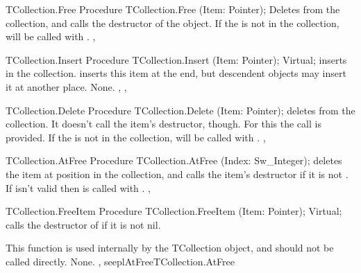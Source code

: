 

\begin{procedure}{TCollection.Free}
\Declaration
Procedure TCollection.Free (Item: Pointer);
\Description
{} Deletes  from the collection, and calls the destructor
 of the object.
\Errors
If the  is not in the collection,  will be called with
.
\SeeAlso
{},
\end{procedure}



\begin{procedure}{TCollection.Insert}
\Declaration
Procedure TCollection.Insert (Item: Pointer); Virtual;
\Description
{} inserts  in the collection. 
inserts this item at the end, but descendent objects may insert it at
another place.
\Errors
None.
\SeeAlso
{}, ,
\end{procedure}


\begin{procedure}{TCollection.Delete}
\Declaration
Procedure TCollection.Delete (Item: Pointer);
\Description
{} deletes  from the collection. It doesn't call the
item's destructor, though. For this the 
call is provided.
\Errors
If the  is not in the collection,  will be called with
.
\SeeAlso
{},
\end{procedure}



\begin{procedure}{TCollection.AtFree}
\Declaration
Procedure TCollection.AtFree (Index: Sw\_Integer);
\Description
{} deletes the item at position  in the collection,
and calls the item's destructor if it is not . 
\Errors
If  isn't valid then  is called
with .
\SeeAlso
{}, 
\end{procedure}



\begin{procedure}{TCollection.FreeItem}
\Declaration
Procedure TCollection.FreeItem (Item: Pointer); Virtual;
\Description
{} calls the destructor of  if it is not nil.

This function is used internally by the TCollection object, and should not be
called directly.
\Errors
None.
\SeeAlso
{}, seepl{AtFree}{TCollection.AtFree}
\end{procedure}


